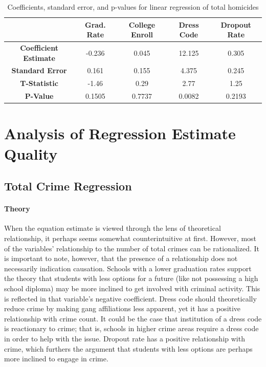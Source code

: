 \documentclass[12pt]{article}
\begin{document}
\begin{center}
	\begin{table}[h]
		\begin{tabular}{ c | c | c | c | c }
			
			& \textbf{Grad. Rate} & \textbf{College Enroll} & \textbf{Dress Code} & \textbf{Dropout Rate} \\
			\hline
			\textbf{Coefficient Estimate} & -0.236 & 0.045 & 12.125 & 0.305 \\
			\textbf{Standard Error} & 0.161 & 0.155 & 4.375 & 0.245 \\
			\textbf{T-Statistic} & -1.46 & 0.29 & 2.77 & 1.25\\
			\textbf{P-Value} & 0.1505 & 0.7737 & 0.0082 & 0.2193		
		\end{tabular}
		\caption{Coefficients, standard error, and p-values for linear regression of total homicides}
	\end{table}
\end{center}



	\section{Analysis of Regression Estimate Quality}


	\subsection{Total Crime Regression}
	
	\paragraph{Theory}
	When the equation estimate is viewed through the lens of theoretical relationship, it perhaps seems somewhat counterintuitive at first.  However, most of the variables' relationship to the number of total crimes can be rationalized.  It is important to note, however, that the presence of a relationship does not necessarily indication causation.  Schools with a lower graduation rates support the theory that students with less options for a future (like not possessing a high school diploma) may be more inclined to get involved with criminal activity.  This is reflected in that variable's negative coefficient.  Dress code should theoretically reduce crime by making gang affiliations less apparent, yet it has a positive relationship with crime count.  It could be the case that institution of a dress code is reactionary to crime; that is, schools in higher crime areas require a dress code in order to help with the issue.  Dropout rate has a positive relationship with crime, which furthers the argument that students with less options are perhaps more inclined to engage in crime.
	
\end{document}
